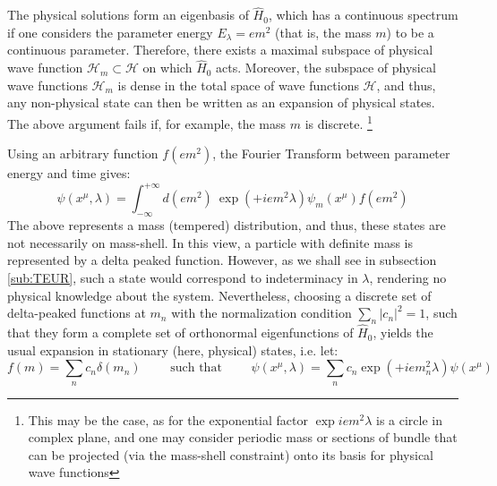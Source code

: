 \documentclass[twoside,a4paper,11pt]{article}
\newcommand\numberthis{\addtocounter{equation}{1}\tag{\theequation}} %
\numberwithin{equation}{section}
\begin{document}
The physical solutions form an eigenbasis of $\hat{H}_0$, which has a continuous spectrum if one considers the parameter energy $E_\lambda = e m^2$ (that is, the mass $m$) to be a continuous parameter. Therefore, there exists a maximal subspace of physical wave function $\mathcal{H}_m \subset \mathcal{H}$ on which $\hat{H}_0$ acts. Moreover, the subspace of physical wave functions $\mathcal{H}_m$ is dense in the total space of wave functions $\mathcal{H}$, and thus, any non-physical state can then be written as an expansion of physical states. The above argument fails if, for example, the mass $m$ is discrete. \footnote{This may be the case, as for the exponential factor $\exp{iem^2\lambda}$ is a circle in complex plane, and one may consider periodic mass or sections of bundle that can be projected (via the mass-shell constraint) onto its basis for physical wave functions}

Using an arbitrary function $f(em^2)$, the Fourier Transform between parameter energy and time gives:
\begin{equation}
    \psi (x^\mu, \lambda) = \int_{-\infty}^{+\infty}  d(em^2) \   \exp{\left( +i e m^2\lambda\right)} \psi_m(x^\mu) f(em^2)
    \label{eq:FTmasslambda}
\end{equation}
The above represents a mass (tempered) distribution, and thus, these states are not necessarily on mass-shell. In this view, a particle with definite mass is represented by a delta peaked function. However, as we shall see in subsection \ref{sub:TEUR}, such a state would correspond to indeterminacy in $\lambda$, rendering no physical knowledge about the system. Nevertheless, choosing a discrete set of delta-peaked functions at $m_n$ with the normalization condition $\sum_n |c_n|^2 = 1$, such that they form a complete set of orthonormal eigenfunctions of $\hat{H}_0$, yields the usual expansion in stationary (here, physical) states, i.e. let:
\begin{equation}
    f(m) = \sum_n c_n \delta(m_n) \qquad \text{ such that } \qquad 
   \psi (x^\mu, \lambda) = \sum_n c_n  \exp{\left( +i e m_n^2 \lambda\right)} \psi(x^\mu) 
\end{equation}

\end{document}

